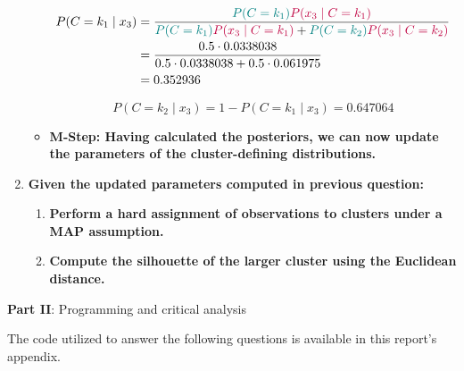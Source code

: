 \documentclass[12pt]{article}
\begin{document}
\begin{enumerate}[leftmargin=\labelsep]
\begin{itemize}[leftmargin=]
                \begin{equation*}
                  \begin{aligned}
                    P(C = k_1 \mid x_3) & = \frac{\textcolor{teal}{P(C = k_1)} \textcolor{purple}{P(x_3 \mid C = k_1)}}{\textcolor{teal}{P(C = k_1)} \textcolor{purple}{P(x_3 \mid C = k_1)} + \textcolor{teal}{P(C = k_2)} \textcolor{purple}{P(x_3 \mid C = k_2)}} \\
                                        & = \frac{0.5 \cdot 0.0338038}{0.5 \cdot 0.0338038 + 0.5 \cdot 0.061975}                                                                                                                                                     \\
                                        & = 0.352936
                  \end{aligned}
                \end{equation*}

                \begin{equation*}
                  P(C = k_2 \mid x_3) = 1 - P(C = k_1 \mid x_3) = 0.647064
                \end{equation*}

          \item \textbf{M-Step: Having calculated the posteriors, we can now
                  update the parameters of the cluster-defining distributions.}

        \end{itemize}

  \item \textbf{Given the updated parameters computed in previous question:}

        \begin{enumerate}[leftmargin=\labelsep]
          \item \textbf{Perform a hard assignment of observations to clusters under a MAP assumption.}
          \item \textbf{Compute the silhouette of the larger cluster using the Euclidean distance.}
        \end{enumerate}

\end{enumerate}

\pagebreak

\center\large{\textbf{Part II}: Programming and critical analysis}

\begin{justify}
  The code utilized to answer the following questions is available in this
  report's appendix.
\end{justify}
\end{document}
